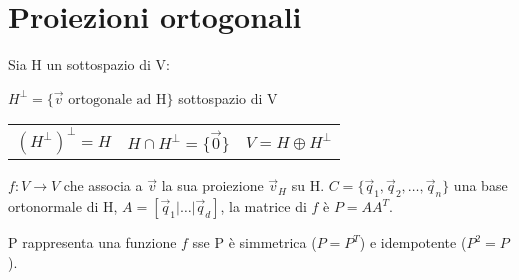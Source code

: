 \section{Proiezioni ortogonali}

Sia H un sottospazio di V:

$H^\perp = \{\vec{v}\text{ ortogonale ad H}\}$ sottospazio di V

\begin{tabular}{lll}
	$(H^\perp)^\perp = H$ & $H\cap H^\perp = \{\vec{0}\}$ & $V=H\oplus H^\perp$
\end{tabular}

$f: V \rightarrow V$ che associa a $\vec{v}$ la sua proiezione $\vec{v}_H$ su H.
$C = \{\vec{q}_1, \vec{q}_2, \dots, \vec{q}_n\}$ una base ortonormale di H, $A = [\vec{q}_1 | \dots | \vec{q}_d]$, la matrice di $f$ è $P=AA^T$.

P rappresenta una funzione $f$ sse P è simmetrica ($P=P^T$) e idempotente ($P^2=P$).
